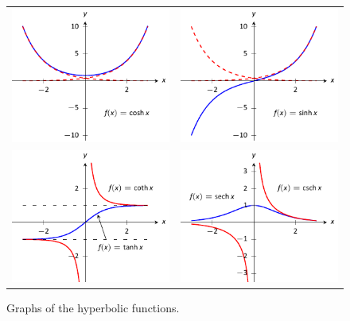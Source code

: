 \begin{figure} %
\begin{center}
\begin{tabular}{cc}
\includegraphics{figures/fighf_cosh}  & \includegraphics{figures/fighf_sinh} \\[20pt]
\includegraphics{figures/fighf_tanh_coth} &\includegraphics{figures/fighf_sech_csch}
\end{tabular}
\caption{Graphs of the hyperbolic functions.}
\label{fig:6.8_hyperbolicgraphs}
\end{center}
\end{figure}
 
